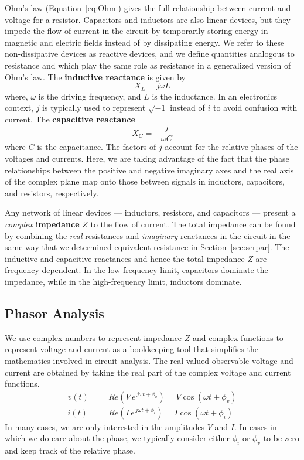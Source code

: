 \documentclass[11pt]{article}
\begin{document}
Ohm's law (Equation~\ref{eq:Ohm}) gives the full relationship between
current and voltage for a resistor. Capacitors and inductors are also
linear devices, but they impede the flow of current in the circuit
by temporarily storing energy in magnetic and electric fields instead
of by dissipating energy. We refer to these non-dissipative devices as
reactive devices, and we define quantities analogous to resistance
and which play the same role as resistance in a generalized version of
Ohm's law. The \textbf{inductive reactance} is given by
\begin{equation}
  X_L = j \omega L
  \label{eq:xl}
\end{equation}
where, $\omega$ is the driving frequency, and $L$ is the
inductance. In an electronics context,  $j$ is typically used to
represent $\sqrt{-1}$ instead of $i$ to avoid confusion with
current. The \textbf{capacitive reactance} 
\begin{equation}
  X_C = -\frac{j}{\omega C}
  \label{eq:xc}
\end{equation}
where $C$ is the capacitance. The factors of $j$ account for the
relative phases of the voltages and currents. Here, we are taking
advantage of the fact that the phase relationships between the
positive and negative imaginary axes and the real axis of the complex
plane map onto those between signals in inductors, capacitors, and
resistors, respectively.

Any network of linear devices ---  inductors, resistors, and
capacitors --- present a \emph{complex} \textbf{impedance} $Z$ to the
flow of current. The total impedance can be found by combining the
\emph{real} resistances and \emph{imaginary} reactances in the circuit
in the same way that we determined equivalent resistance in
Section~\ref{sec:serpar}. The inductive and capacitive reactances and
hence the total impedance $Z$ are frequency-dependent. In the
low-frequency limit, capacitors dominate the impedance, while in the
high-frequency limit, inductors dominate.

\subsection{Phasor Analysis}

We use complex numbers to represent impedance $Z$ and complex
functions to represent voltage and current as a bookkeeping
tool that simplifies the mathematics involved in circuit
analysis. The real-valued observable voltage and current are obtained
by  taking the real part of the complex voltage and current functions.
\begin{eqnarray}
  v(t) &=& Re(V \, e^{\,j\omega t + \phi_v}) = V \cos(\omega t + \phi_v)\\
  \nonumber
  i(t) &=& Re(I \, e^{\,j\omega t + \phi_i}) = I \cos(\omega t + \phi_i)
\end{eqnarray}
In many cases, we are only interested in the amplitudes $V$ and
$I$. In cases in which we do care about the phase, we typically
consider either $\phi_i$ or $\phi_v$ to be zero and keep track of the
relative phase.
\end{document}
